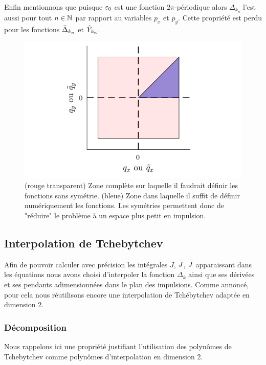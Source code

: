 \documentclass[10pt]{article}
\begin{document}
\begin{multicols}{2}
 Enfin mentionnons que puisque $\varepsilon_0$ est une fonction $2\pi$-périodique alors $\Delta_{k_n}$ l'est aussi pour tout $n\in\mathbb{N}$ par rapport au variables $p_x$ et $p_y$. Cette propriété est perdu pour les fonctions $\bar{\Delta}_{k_n}$ et $\tilde{Y}_{k_n}$.
\begin{figure}[H]
\begin{center}
	\includegraphics[width=0.95\columnwidth]{SurfUtile.pdf}
\end{center}
\vspace*{-22pt}
\caption{(rouge transparent) Zone complète sur laquelle il faudrait définir les fonctions sans symétrie. (bleue) Zone dans laquelle il suffit de définir numériquement les fonctions. Les symétries permettent donc de "réduire" le problème à un espace plus petit en impulsion.}
\label{fig:SurfUtile}
\end{figure}


\subsection{Interpolation de Tchebytchev}

Afin de pouvoir calculer avec précision les intégrales $J$, $\bar{J}$, $\tilde{J}$ apparaissant dans les équations nous avons choisi d'interpoler la fonction $\Delta_k$ ainsi que ses dérivées et ses pendants adimensionnées dans le plan des impulsions. Comme annoncé, pour cela nous réutilisons encore une interpolation de Tchébytchev adaptée en dimension 2. 

\subsubsection{Décomposition}

Nous rappelons ici une propriété justifiant l'utilisation des polynômes de Tchebytchev comme polynômes d'interpolation en dimension 2.\\


\end{multicols}
\end{document}
